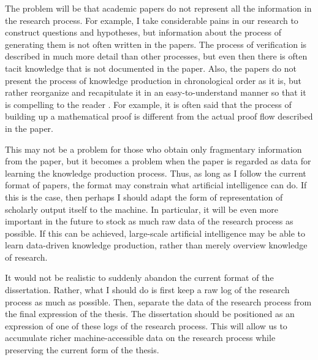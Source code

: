 \documentclass{article}
\begin{document}
The problem will be that academic papers do not represent all the information in the research process. For example, I take considerable pains in our research to construct questions and hypotheses, but information about the process of generating them is not often written in the papers. The process of verification is described in much more detail than other processes, but even then there is often tacit knowledge that is not documented in the paper. Also, the papers do not present the process of knowledge production in chronological order as it is, but rather reorganize and recapitulate it in an easy-to-understand manner so that it is compelling to the reader \cite{schickore2008doing}. For example, it is often said that the process of building up a mathematical proof is different from the actual proof flow described in the paper. 

This may not be a problem for those who obtain only fragmentary information from the paper, but it becomes a problem when the paper is regarded as data for learning the knowledge production process. Thus, as long as I follow the current format of papers, the format may constrain what artificial intelligence can do. If this is the case, then perhaps I should adapt the form of representation of scholarly output itself to the machine. In particular, it will be even more important in the future to stock as much raw data of the research process as possible. If this can be achieved, large-scale artificial intelligence may be able to learn data-driven knowledge production, rather than merely overview knowledge of research.

It would not be realistic to suddenly abandon the current format of the dissertation. Rather, what I should do is first keep a raw log of the research process as much as possible. Then, separate the data of the research process from the final expression of the thesis. The dissertation should be positioned as an expression of one of these logs of the research process. This will allow us to accumulate richer machine-accessible data on the research process while preserving the current form of the thesis.

\end{document}
